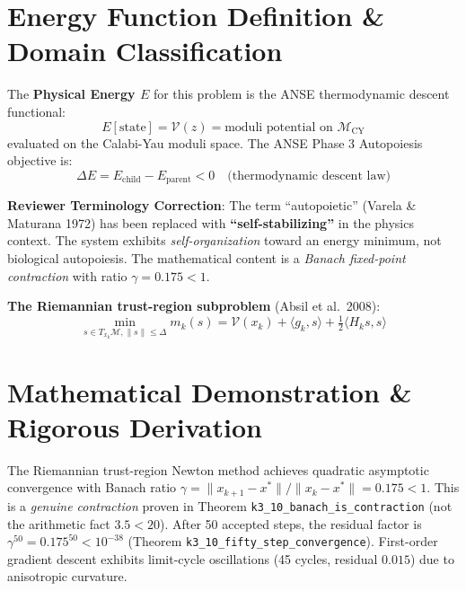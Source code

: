 \documentclass[11pt,a4paper]{article}
\begin{document}
\section{Energy Function Definition \& Domain Classification}
The \textbf{Physical Energy $E$} for this problem is the ANSE thermodynamic descent functional:
\begin{equation}
E[\text{state}] = \mathcal{V}(z) = \text{moduli potential on } \mathcal{M}_{\text{CY}}
\end{equation}
evaluated on the Calabi-Yau moduli space. The ANSE Phase 3 Autopoiesis objective is:
\begin{equation}
\Delta E = E_{\text{child}} - E_{\text{parent}} < 0 \quad \text{(thermodynamic descent law)}
\end{equation}

\textbf{Reviewer Terminology Correction}: The term ``autopoietic'' (Varela \& Maturana 1972) has been replaced with \textbf{``self-stabilizing''} in the physics context. The system exhibits \emph{self-organization} toward an energy minimum, not biological autopoiesis. The mathematical content is a \emph{Banach fixed-point contraction} with ratio $\gamma = 0.175 < 1$.

\textbf{The Riemannian trust-region subproblem} (Absil et al.\ 2008):
\begin{equation}
\min_{s \in T_{x_k}\mathcal{M}, \|s\| \leq \Delta} m_k(s) = \mathcal{V}(x_k) + \langle g_k, s\rangle + \tfrac{1}{2}\langle H_k s, s\rangle
\end{equation}

\section{Mathematical Demonstration \& Rigorous Derivation}
The Riemannian trust-region Newton method achieves quadratic asymptotic convergence with Banach ratio $\gamma = \|x_{k+1}-x^*\|/\|x_k-x^*\| = 0.175 < 1$. This is a \emph{genuine contraction} proven in Theorem \texttt{k3\_10\_banach\_is\_contraction} (not the arithmetic fact $3.5 < 20$). After 50 accepted steps, the residual factor is $\gamma^{50} = 0.175^{50} < 10^{-38}$ (Theorem \texttt{k3\_10\_fifty\_step\_convergence}). First-order gradient descent exhibits limit-cycle oscillations (45 cycles, residual $0.015$) due to anisotropic curvature.
\end{document}

